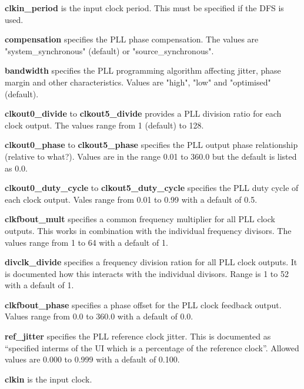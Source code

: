                 {\bf clkin\_period} is the input clock period. This must be
                specified if the DFS is used.

                {\bf compensation} specifies the PLL phase compensation. The values are
                "system\_synchronous" (default) or "source\_synchronous".

                {\bf bandwidth} specifies the PLL programming algorithm affecting jitter,
                phase margin and other characteristics. Values are "high", "low" and
                "optimised" (default).

                {\bf clkout0\_divide} to {\bf clkout5\_divide} provides a PLL division ratio
                for each clock output. The values range from 1 (default) to 128.

                {\bf clkout0\_phase} to {\bf clkout5\_phase} specifies the PLL output phase
                relationship (relative to what?). Values are in the range 0.01 to 360.0 but
                the default is listed as 0.0.

                {\bf clkout0\_duty\_cycle} to {\bf clkout5\_duty\_cycle} specifies the PLL
                duty cycle of each clock output. Vales range from 0.01 to 0.99 with a
                default of 0.5.

                {\bf clkfbout\_mult} specifies a common frequency multiplier for all PLL
                clock outputs. This works in combination with the individual frequency
                divisors. The values range from 1 to 64 with a default of 1.

                {\bf divclk\_divide} specifies a frequency division ration for all PLL clock
                outputs. It is documented how this interacts with the individual divisors.
                Range is 1 to 52 with a default of 1.

                {\bf clkfbout\_phase} specifies a phase offset for the PLL clock feedback
                output. Values range from 0.0 to 360.0 with a default of 0.0.

                {\bf ref\_jitter} specifies the PLL reference clock jitter. This is documented
                as ``specified interms of the UI which is a percentage of the reference
                clock''. Allowed values are 0.000 to 0.999 with a default of 0.100.



            {\bf clkin} is the input clock.

